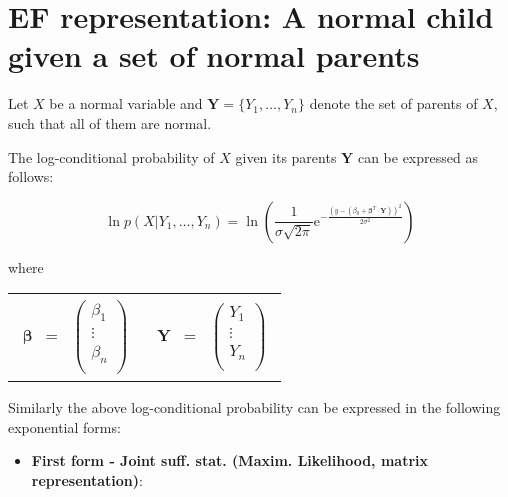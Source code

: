 \documentclass[11pt, oneside]{article}   	%
\newcommand{\bm}{\mathbf}
\newcommand{\bs}{\boldsymbol}
\newcommand{\me}{\mathrm{e}}
\numberwithin{figure}{section}
\numberwithin{equation}{section}
\numberwithin{table}{section}
\theoremstyle{definition}
\begin{document}
\begin{appendices}
\begin{itemize}
\end{itemize}


\newpage
\section{EF representation: A normal child given a set of normal parents}

Let $X$ be a normal variable and $ \mathbf{Y} = \{Y_1,\ldots,Y_n\}$ denote the set of parents of $X$, such that all of them are normal. 

The log-conditional probability of $X$ given its parents $\mathbf{Y}$ can be expressed as follows:

$$ \ln p(X|Y_1,\ldots,Y_n) = \ln \left(\frac{1}{\sigma \sqrt{2\pi}} \me^{-\frac{(y-(\beta_0+ \bs \beta^T \cdot \bm Y))^2}{2\sigma^2}} \right)$$

where

\begin{tabular}{p{4cm}p{4cm}}
\begin{eqnarray*}
\bs \beta &=& 
\begin{pmatrix}
\beta_1\\
\vdots\\
\beta_n\\
\end{pmatrix}
\end{eqnarray*}
&
\begin{eqnarray*}
\bm Y &=& 
\begin{pmatrix}
Y_1\\
\vdots\\
Y_n\\
\end{pmatrix}
\end{eqnarray*}
\\
\end{tabular}

Similarly the above log-conditional probability can be expressed in the following exponential forms:


\newcommand{\Z}{\bm Z}
\newcommand{\Y}{\bm Y}
\newcommand{\thb}{\bs \theta}
\newcommand{\beb}{\bs \beta}

\begin{itemize}
\item \textbf{First form - Joint suff. stat. (Maxim. Likelihood, matrix representation)}:


\end{itemize}
\end{appendices}
\end{document}
